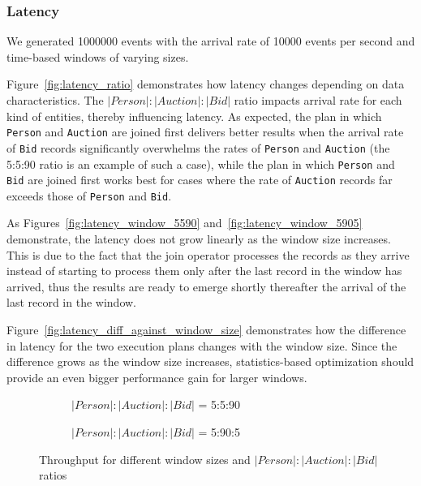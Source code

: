 \subsubsection{Latency}

We generated 1000000 events with the arrival rate of 10000 events per second and time-based windows of varying sizes.

Figure~\ref{fig:latency_ratio} 
demonstrates how latency changes depending on data characteristics. The $|Person|:|Auction|:|Bid|$ ratio impacts arrival rate for each kind of entities, thereby influencing latency. As expected, the plan in which \texttt{Person} and \texttt{Auction} are joined first delivers better results when the arrival rate of \texttt{Bid} records significantly overwhelms the rates of \texttt{Person} and \texttt{Auction} (the 5:5:90 ratio is an example of such a case), while the plan in which \texttt{Person} and \texttt{Bid} are joined first works best for cases where the rate of \texttt{Auction} records far exceeds those of \texttt{Person} and \texttt{Bid}. 

As Figures~\ref{fig:latency_window_5590} and~\ref{fig:latency_window_5905} demonstrate, the latency does not grow linearly as the window size increases. This is due to the fact that the join operator processes the records as they arrive instead of starting to process them only after the last record in the window has arrived, thus the results are ready to emerge shortly thereafter the arrival of the last record in the window.

Figure~\ref{fig:latency_diff_against_window_size} demonstrates how the difference in latency for the two execution plans changes with the window size. Since the difference grows as the window size increases, statistics-based optimization should provide an even bigger performance gain for larger windows.

\begin{figure}[!ht]
    \centering
    \begin{subfigure}[b]{0.45\textwidth}
            
            \captionsetup{justification=justified}
            \caption{$|Person|:|Auction|:|Bid|$ = 5:5:90}
            \label{fig:throughput_window_5590}
    \end{subfigure}
    \hspace{1.25mm}
    \begin{subfigure}[b]{0.45\textwidth}
            
            \captionsetup{justification=justified}
            \caption{$|Person|:|Auction|:|Bid|$ = 5:90:5}
            \label{fig:throughput_window_5905}
    \end{subfigure}
    \caption{Throughput for different window sizes and $|Person|:|Auction|:|Bid|$ ratios}
    \label{fig:throughput_plots}
\end{figure}

